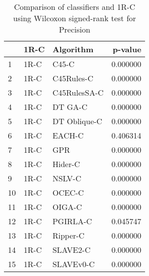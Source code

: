 \begin{table}
\footnotesize
\caption{Comparison of classifiers and 1R-C using Wilcoxon signed-rank test for Precision}
\label{tab:1R-C wilcoxon Precision comparison}
\begin{tabular}{lllr}
\hline
 & 1R-C & Algorithm & p-value \\
\hline
1 & 1R-C & C45-C & 0.000000 \\
2 & 1R-C & C45Rules-C & 0.000000 \\
3 & 1R-C & C45RulesSA-C & 0.000000 \\
4 & 1R-C & DT GA-C & 0.000000 \\
5 & 1R-C & DT Oblique-C & 0.000000 \\
6 & 1R-C & EACH-C & 0.406314 \\
7 & 1R-C & GPR & 0.000000 \\
8 & 1R-C & Hider-C & 0.000000 \\
9 & 1R-C & NSLV-C & 0.000000 \\
10 & 1R-C & OCEC-C & 0.000000 \\
11 & 1R-C & OIGA-C & 0.000000 \\
12 & 1R-C & PGIRLA-C & 0.045747 \\
13 & 1R-C & Ripper-C & 0.000000 \\
14 & 1R-C & SLAVE2-C & 0.000000 \\
15 & 1R-C & SLAVEv0-C & 0.000000 \\
\hline
\end{tabular}
\end{table}
